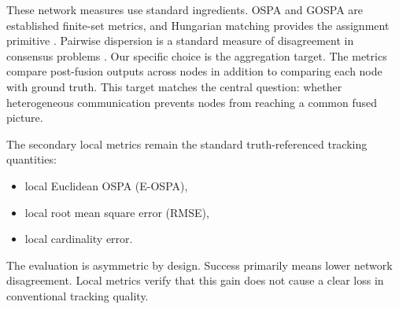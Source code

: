 These network measures use standard ingredients. OSPA and GOSPA are established finite-set metrics, and Hungarian matching provides the assignment primitive \cite{Schuhmacher2008OSPA,Rahmathullah2017GOSPA,Ristic2011TrackMetric}. Pairwise dispersion is a standard measure of disagreement in consensus problems \cite{XiaoBoydLall2005ConsensusWeights}. Our specific choice is the aggregation target. The metrics compare post-fusion outputs across nodes in addition to comparing each node with ground truth. This target matches the central question: whether heterogeneous communication prevents nodes from reaching a common fused picture.

The secondary local metrics remain the standard truth-referenced tracking quantities:
\begin{itemize}
\item local Euclidean OSPA (E-OSPA),
\item local root mean square error (RMSE),
\item local cardinality error.
\end{itemize}
The evaluation is asymmetric by design. Success primarily means lower network disagreement. Local metrics verify that this gain does not cause a clear loss in conventional tracking quality.
